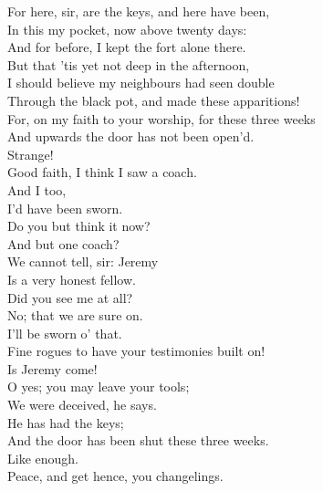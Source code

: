 \documentclass[a4paper,oneside]{memoir}
\begin{document}
\begin{drama*}
For here, sir, are the keys, and here have been,\\
In this my pocket, now above twenty days:\\
And for before, I kept the fort alone there.\\
But that 'tis yet not deep in the afternoon,\\
I should believe my neighbours had seen double\\
Through the black pot, and made these apparitions!\\
For, on my faith to your worship, for these three weeks\\
And upwards the door has not been open'd.\\
\lovewitspeaks Strange!\\
\neighonespeaks {} Good faith, I think I saw a coach.\\
\neightwospeaks {} And I too,\\
I'd have been sworn.\\
\lovewitspeaks {} Do you but think it now?\\
And but one coach?\\
\neighfourspeaks {} We cannot tell, sir: Jeremy\\
Is a very honest fellow.\\
\facespeaks {} Did you see me at all?\\
\neighonespeaks No; that we are sure on.\\
\neightwospeaks {} I'll be sworn o' that.\\
\lovewitspeaks Fine rogues to have your testimonies built on!\\
\neighthreespeaks Is Jeremy come!\\
\neighonespeaks {} O yes; you may leave your tools;\\
We were deceived, he says.\\
\neightwospeaks {} He has had the keys;\\
And the door has been shut these three weeks.\\
\neighthreespeaks {} Like enough.\\
\lovewitspeaks Peace, and get hence, you changelings.\\

\end{drama*}
\end{document}
